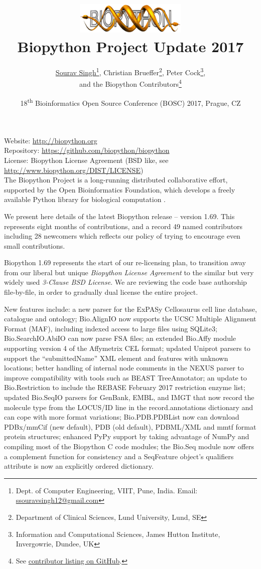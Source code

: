 \documentclass[10pt,oneside]{article}
\title{%
\vspace{-1.5in}
\includegraphics[width=0.4\textwidth]{biopython.jpg}\\
\vspace{3mm}Biopython Project Update 2017}
\author{
	\underline{Sourav Singh}\thanks{Dept. of Computer Engineering, VIIT, Pune, India. Email: \href{mailto:ssouravsingh12@gmail.com}{ssouravsingh12@gmail.com}},
    Christian Brueffer\thanks{Department of Clinical Sciences, Lund University, Lund, SE},
    Peter Cock\thanks{Information and Computational Sciences, James Hutton Institute, Invergowrie, Dundee, UK},\\
    and the Biopython Contributors\thanks{See \href{https://github.com/biopython/biopython/blob/master/CONTRIB.rst}{contributor listing on GitHub}.}}
\date{18\textsuperscript{th} Bioinformatics Open Source Conference (BOSC) 2017, Prague, CZ}
\begin{document}
\maketitle
\thispagestyle{empty}

\vspace{-0.2in}
\noindent
Website: \url{http://biopython.org} \\
Repository: \url{https://github.com/biopython/biopython} \\
License: Biopython License Agreement (BSD like, see \url{http://www.biopython.org/DIST/LICENSE}) \\

The Biopython Project is a long-running distributed collaborative effort,
supported by the Open Bioinformatics Foundation, which develops a freely
available Python library for biological computation \cite{AppNote}.

We present here details of the latest Biopython release -- version 1.69.
This represents eight months of contributions, and a record 49 named
contributors including 28 newcomers which reflects our policy of trying to
encourage even small contributions.

Biopython 1.69 represents the start of our re-licensing plan, to transition away
from our liberal but unique \emph{Biopython License Agreement} to the similar
but very widely used \emph{3-Clause BSD License}. We are reviewing the code
base authorship file-by-file, in order to gradually dual license the entire
project.

New features include: a new parser for the ExPASy Cellosaurus cell line
database, catalogue and ontology; Bio.AlignIO now supports the UCSC Multiple
Alignment Format (MAF), including indexed access to large files using SQLite3;
Bio.SearchIO.AbiIO can now parse FSA files; an extended Bio.Affy module supporting
version 4 of the Affymetrix CEL format; updated Uniprot parsers to support
the ``submittedName'' XML element and features with unknown locations; better
handling of internal node comments in the NEXUS parser to improve compatibility
with tools such as BEAST TreeAnnotator; an update to Bio.Restriction to include
the REBASE February 2017 restriction enzyme list; updated Bio.SeqIO parsers for
GenBank, EMBL, and IMGT that now record the molecule type from the LOCUS/ID line
in the record.annotations dictionary and can cope with more format variations;
Bio.PDB.PDBList now can download PDBx/mmCif (new default), PDB (old default),
PDBML/XML and mmtf format protein structures; enhanced PyPy support by taking
advantage of NumPy and compiling most of the Biopython C code modules; the Bio.Seq
module now offers a complement function for consistency and a SeqFeature object's
qualifiers attribute is now an explicitly ordered dictionary.
\end{document}
